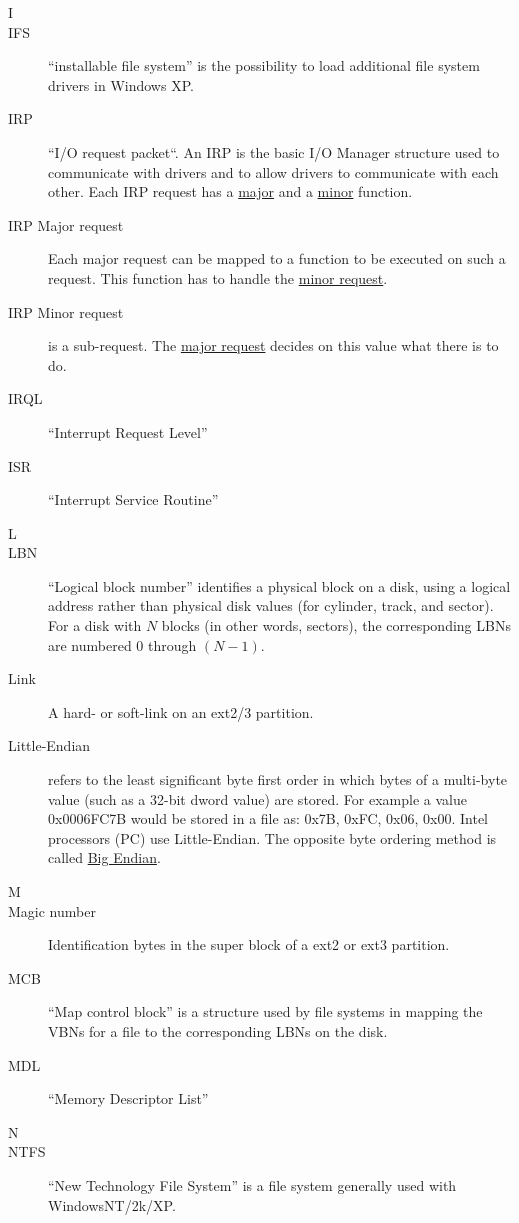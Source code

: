\begin{description}
\item[\Large{I}]
\item[IFS] ``installable file system'' is the possibility to load additional file system drivers in Windows XP.
\item[IRP] ``I/O request packet``. An IRP is the basic I/O Manager structure used to communicate with drivers and to allow drivers to communicate with each other. Each IRP request has a \hyperlink{major}{major} and a \hyperlink{minor}{minor} function.
\hypertarget{major}{}
\item[IRP Major request] Each major request can be mapped to a function to be executed on such a request. This function has to handle the \hyperlink{minor}{minor request}.
\hypertarget{minor}{}
\item[IRP Minor request] is a sub-request. The \hyperlink{major}{major request} decides on this value what there is to do.
\item[IRQL] ``Interrupt Request Level''
\item[ISR] ``Interrupt Service Routine''

\item[\Large{L}]
\item[LBN] ``Logical block number'' identifies a physical block on a disk, using a logical address rather than physical disk values (for cylinder, track, and sector). For a disk with $N$ blocks (in other words, sectors), the corresponding LBNs are numbered 0 through $(N - 1)$.
\item[Link] A hard- or soft-link on an ext2/3 partition.
\hypertarget{lendian}{}
\item[Little-Endian] refers to the least significant byte first order in which bytes of a multi-byte value (such as a 32-bit dword value) are stored. For example a value 0x0006FC7B would be stored in a file as: 0x7B, 0xFC, 0x06, 0x00. Intel processors (PC) use Little-Endian. The opposite byte ordering method is called \hyperlink{bendian}{Big Endian}.

\item[\Large{M}]
\item[Magic number] Identification bytes in the super block of a ext2 or ext3 partition.
\item[MCB] ``Map control block'' is a structure used by file systems in mapping the VBNs for a file to the corresponding LBNs on the disk. 
\item[MDL] ``Memory Descriptor List''

\item[\Large{N}]
\item[NTFS] ``New Technology File System'' is a file system generally used with WindowsNT/2k/XP.


\end{description}
